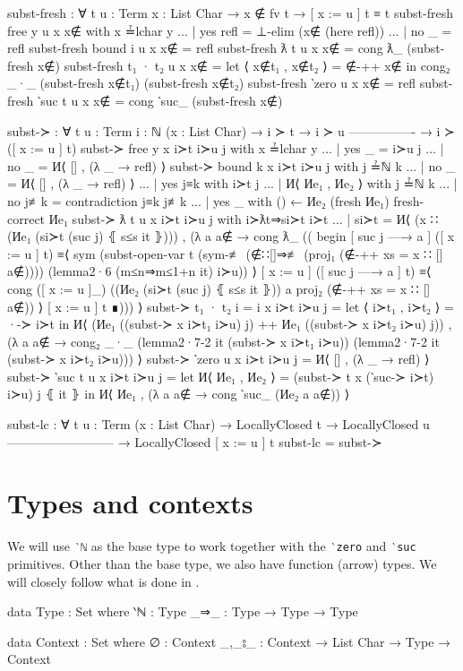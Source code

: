 \begin{code}    
  subst-fresh : ∀ {t u : Term} {x : List Char}
    → x ∉ fv t
    → [ x := u ] t ≡ t
  subst-fresh {free y} {u} {x} x∉ with x ≟lchar y
  ... | yes refl = ⊥-elim (x∉ (here refl))
  ... | no  _    = refl
  subst-fresh {bound i} {u} {x} x∉ = refl
  subst-fresh {ƛ t} {u} {x} x∉ = cong ƛ_ (subst-fresh x∉)
  subst-fresh {t₁ · t₂} {u} {x} x∉ =
    let ⟨ x∉t₁ , x∉t₂ ⟩ = ∉-++ x∉ in
      cong₂ _·_ (subst-fresh x∉t₁) (subst-fresh x∉t₂)
  subst-fresh {‵zero} {u} {x} x∉ = refl
  subst-fresh {‵suc t} {u} {x} x∉ = cong ‵suc_ (subst-fresh x∉)

  subst-≻ : ∀ {t u : Term} {i : ℕ} (x : List Char)
    → i ≻ t
    → i ≻ u
      ----------------
    → i ≻ ([ x := u ] t)
  subst-≻ {free y} x i≻t i≻u j with x ≟lchar y
  ... | yes _ = i≻u j
  ... | no  _ = И⟨ [] , (λ _ → refl) ⟩
  subst-≻ {bound k} x i≻t i≻u j with j ≟ℕ k
  ... | no  _   = И⟨ [] , (λ _ → refl) ⟩
  ... | yes j≡k with i≻t j
  ...   | И⟨ Иe₁ , Иe₂ ⟩ with j ≟ℕ k
  ...     | no  j≢k = contradiction j≡k j≢k
  ...     | yes _   with () ← Иe₂ (fresh Иe₁) {fresh-correct Иe₁}
  subst-≻ {ƛ t} {u} x i≻t i≻u j with i≻ƛt⇒si≻t i≻t
  ... | si≻t =
    И⟨ (x ∷ (Иe₁ (si≻t (suc j) ⦃ s≤s it ⦄)))
    , (λ a {a∉} → cong ƛ_ ((
      begin
        [ suc j —→ a ] ([ x := u ] t)
      ≡⟨ sym (subst-open-var
            t
            (sym-≢ (∉∷[]⇒≢ (proj₁ (∉-++ {xs = x ∷ []} a∉))))
            (lemma2·6 (m≤n⇒m≤1+n it) i≻u)) ⟩
        [ x := u ] ([ suc j —→ a ] t)
      ≡⟨ cong ([ x := u ]_)
          ((Иe₂ (si≻t (suc j) ⦃ s≤s it ⦄))
            a
            {proj₂ (∉-++ {xs = x ∷ []} a∉)}) ⟩
        [ x := u ] t
      ∎))) ⟩
  subst-≻ {t₁ · t₂} {i = i} x i≻t i≻u j =
    let ⟨ i≻t₁ , i≻t₂ ⟩ = ·-≻ i≻t in
      И⟨ (Иe₁ ((subst-≻ x i≻t₁ i≻u) j)
        ++ Иe₁ ((subst-≻ x i≻t₂ i≻u) j))
      , (λ a {a∉} → cong₂ _·_
          (lemma2·7-2 it (subst-≻ x i≻t₁ i≻u))
          (lemma2·7-2 it (subst-≻ x i≻t₂ i≻u))) ⟩
  subst-≻ {‵zero} {u} x i≻t i≻u j = И⟨ [] , (λ _ → refl) ⟩
  subst-≻ {‵suc t} {u} x i≻t i≻u j =
    let И⟨ Иe₁ , Иe₂ ⟩ = (subst-≻ {t} x (‵suc-≻ i≻t) i≻u) j ⦃ it ⦄
      in И⟨ Иe₁ , (λ a {a∉} → cong ‵suc_ (Иe₂ a {a∉})) ⟩

  subst-lc : ∀ {t u : Term} (x : List Char)
    → LocallyClosed t
    → LocallyClosed u
      --------------------------
    → LocallyClosed [ x := u ] t
  subst-lc = subst-≻
\end{code}

\section{Types and contexts}
\label{appendix:typing_stlc}
We will use \texttt{‵ℕ} as the base type to work together with the
\texttt{‵zero} and \texttt{‵suc} primitives. Other than the base type, we also have function (arrow)
types. We will closely follow what is done in \citet{wadler_programming_2022}.
\begin{code}
  data Type : Set where
    ‵ℕ : Type
    _⇒_ : Type → Type → Type

  data Context : Set where
    ∅ : Context
    _,_⦂_ : Context → List Char → Type → Context
\end{code}

